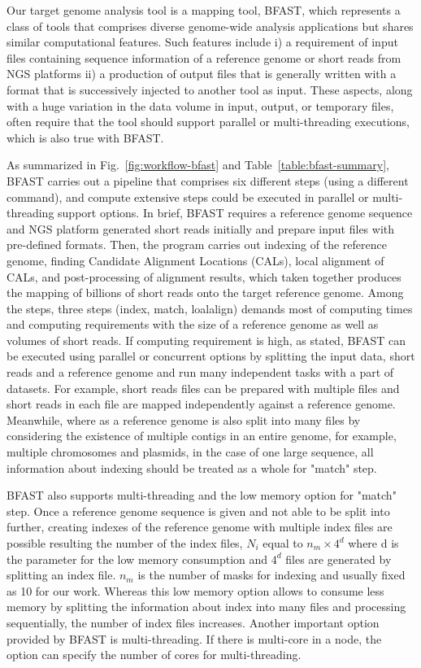 \documentclass[12pt]{article}
\begin{document}
Our target genome analysis tool is a mapping tool, BFAST\cite{bfast2009,bfast2009b}, which represents a class of tools that comprises diverse genome-wide analysis applications but shares similar computational features.  Such features include i) a requirement of input files containing sequence information of a reference genome or short reads from NGS platforms ii) a production of output files that is generally written with a format that is successively injected to another tool as input.  These aspects, along with a huge variation in the data volume in input, output, or temporary files, often require that the tool should support parallel or multi-threading executions, which is also true with BFAST\cite{bfast2009}.

As summarized in Fig.~\ref{fig:workflow-bfast} and Table~\ref{table:bfast-summary}, BFAST carries out a pipeline that comprises six different steps (using a different command), and compute extensive steps could be executed in parallel or multi-threading support options.  In brief, BFAST requires a reference genome sequence and NGS platform generated short reads initially and prepare input files with pre-defined formats.  Then, the program carries out indexing of the reference genome, finding Candidate Alignment Locations (CALs), local alignment of CALs, and post-processing of alignment results, which taken together produces the mapping of billions of short reads onto the target reference genome.  Among the steps, three steps (index, match, loalalign) demands most of computing times and computing requirements with the size of a reference genome as well as volumes of short reads.  If computing requirement is high, as stated, BFAST can be executed using parallel or concurrent options by splitting the input data, short reads and a reference genome and run many independent tasks with a part of datasets.  For example, short reads files can be prepared with multiple files and short reads in each file are mapped independently against a reference genome.  Meanwhile, where as a reference genome is also split into many files by considering the existence of multiple contigs in an entire genome, for example, multiple chromosomes and plasmids, in the case of one large sequence, all information about indexing should be treated as a whole for "match" step. 

BFAST also supports multi-threading and the low memory option for "match" step. Once a reference genome sequence is given and not able to be split into further, creating indexes of the reference genome with multiple index files are possible resulting the number of the index files, $N_i$ equal to $n_m \times 4^d$ where d is the parameter for the low memory consumption and $4^d$ files are generated by splitting an index file.  $n_m$ is the number of masks for indexing and usually fixed as 10 for our work.  Whereas this low memory option allows to consume less memory by splitting the information about index into many files and processing sequentially, the number of index files increases.  Another important option provided by BFAST is multi-threading.  If there is multi-core in a node, the option can specify the number of cores for multi-threading.    
\end{document}
